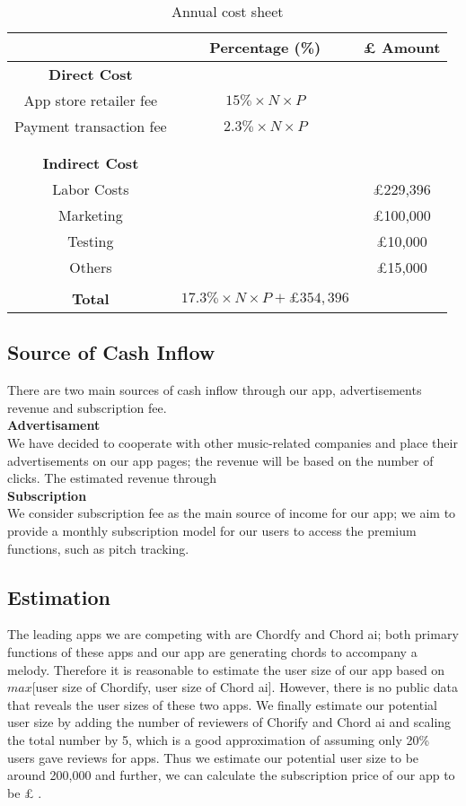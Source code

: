 \begin{table}[ht]
\centering
\begin{tabular}{ |c|c|c|} 
 \hline
 &\textbf{Percentage (\%)} &\textbf{ £ Amount }\\
 \hline
\multicolumn{1}{|c}{\textbf{Direct Cost}} &\multicolumn{1}{c}{}&\\
 \hline
 App store retailer fee&$15\%\times N \times P$&\\
 \hline
 Payment transaction fee&$2.3\% \times N \times P$&\\
 \hline
 &&\\
 \hline
 \multicolumn{1}{|c}{}&\multicolumn{1}{c}{}&\\\hline
 \multicolumn{1}{|c}{\textbf{Indirect Cost}} &\multicolumn{1}{c}{}&\\
 \hline
 Labor Costs&&£229,396\\
 \hline
 Marketing&&£100,000\\
 \hline
 Testing&&£10,000\\
 \hline
 Others&&£15,000\\
 \hline
 \multicolumn{1}{|c}{}&\multicolumn{1}{c}{}&\\
 \hline
 \textbf{Total}&\multicolumn{1}{c}{$17.3\%\times N \times P + £354,396$}&\\
 \hline
 \end{tabular}
 \caption{Annual cost sheet}
 \end{table}


\subsection{Source of Cash Inflow}
There are two main sources of cash inflow through our app, advertisements revenue and subscription fee.
\\ \textbf{Advertisament}
\\ We have decided to cooperate with other music-related companies and place their advertisements on our app pages; the revenue will be based on the number of clicks. The estimated revenue through 
\\ \textbf{Subscription}
\\We consider subscription fee as the main source of income for our app; we aim to provide a monthly subscription model for our users to access the premium functions, such as pitch tracking.

\subsection{Estimation}
The leading apps we are competing with are Chordfy and Chord ai; both primary functions of these apps and our app are generating chords to accompany a melody.  Therefore it is reasonable to estimate the user size of our app based on $max$[user size of Chordify, user size of Chord ai]. However, there is no public data that reveals the user sizes of these two apps. We finally estimate our potential user size by adding the number of reviewers of Chorify and Chord ai and scaling the total number by 5, which is a good approximation of assuming only 20\% users gave reviews for apps. Thus we estimate our potential user size to be around 200,000 and further, we can calculate the subscription price of our app to be £ .

